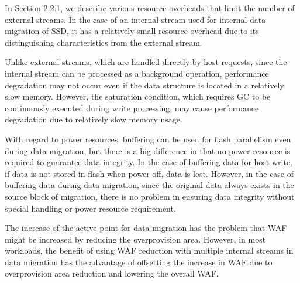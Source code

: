 In Section 2.2.1, we describe various resource overheads that limit the number of external streams.
In the case of an internal stream used for internal data migration of SSD, 
it has a relatively small resource overhead due to its distinguishing characteristics from the external stream.

Unlike external streams, which are handled directly by host requests,
since the internal stream can be processed as a background operation, 
performance degradation may not occur even if the data structure is located in a relatively slow memory.
However, the saturation condition, which requires GC to be continuously executed during write processing, 
may cause performance degradation due to relatively slow memory usage.

With regard to power resources, buffering can be used for flash parallelism even during data migration, but there is a big difference in that no power resource is required to guarantee data integrity.
In the case of buffering data for host write, if data is not stored in flash when power off, data is lost. 
However, in the case of buffering data during data migration, since the original data always exists in the source block of migration, there is no problem in ensuring data integrity without special handling or power resource requirement.

The increase of the active point for data migration has the problem that WAF might be increased by reducing the overprovision area. 
However, in most workloads, the benefit of using WAF reduction with multiple internal streams in data migration has the advantage of offsetting the increase in WAF due to overprovision area reduction and lowering the overall WAF.



